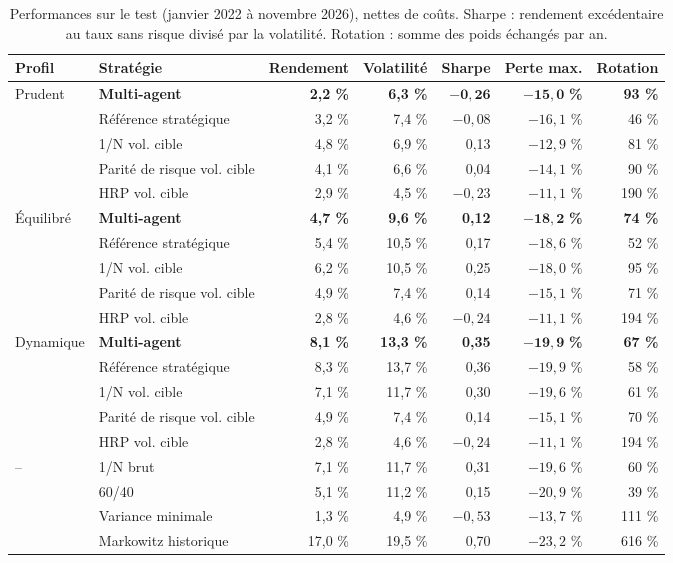 \begin{table}[!htb]
  \centering
  \small
  \caption{Performances sur le test (janvier 2022 à novembre 2026), nettes de coûts. Sharpe : rendement excédentaire au taux sans risque divisé par la volatilité. Rotation : somme des poids échangés par an.}
  \label{tab:backtest}
  \setlength{\tabcolsep}{5pt}
  \begin{tabular}{@{}l l r r r r r@{}}
    \toprule
    \textbf{Profil} & \textbf{Stratégie} & \textbf{Rendement} & \textbf{Volatilité} & \textbf{Sharpe} & \textbf{Perte max.} & \textbf{Rotation} \\
    \midrule
    \multirow{5}{*}{Prudent} & \textbf{Multi-agent} & \textbf{2,2 \%} & \textbf{6,3 \%} & $\boldsymbol{-0{,}26}$ & $\boldsymbol{-15{,}0}$ \textbf{\%} & \textbf{93 \%} \\
     & Référence stratégique & 3,2 \% & 7,4 \% & $-0{,}08$ & $-16{,}1$ \% & 46 \% \\
     & 1/N vol. cible & 4,8 \% & 6,9 \% & 0,13 & $-12{,}9$ \% & 81 \% \\
     & Parité de risque vol. cible & 4,1 \% & 6,6 \% & 0,04 & $-14{,}1$ \% & 90 \% \\
     & HRP vol. cible & 2,9 \% & 4,5 \% & $-0{,}23$ & $-11{,}1$ \% & 190 \% \\
    \midrule
    \multirow{5}{*}{Équilibré} & \textbf{Multi-agent} & \textbf{4,7 \%} & \textbf{9,6 \%} & \textbf{0,12} & $\boldsymbol{-18{,}2}$ \textbf{\%} & \textbf{74 \%} \\
     & Référence stratégique & 5,4 \% & 10,5 \% & 0,17 & $-18{,}6$ \% & 52 \% \\
     & 1/N vol. cible & 6,2 \% & 10,5 \% & 0,25 & $-18{,}0$ \% & 95 \% \\
     & Parité de risque vol. cible & 4,9 \% & 7,4 \% & 0,14 & $-15{,}1$ \% & 71 \% \\
     & HRP vol. cible & 2,8 \% & 4,6 \% & $-0{,}24$ & $-11{,}1$ \% & 194 \% \\
    \midrule
    \multirow{5}{*}{Dynamique} & \textbf{Multi-agent} & \textbf{8,1 \%} & \textbf{13,3 \%} & \textbf{0,35} & $\boldsymbol{-19{,}9}$ \textbf{\%} & \textbf{67 \%} \\
     & Référence stratégique & 8,3 \% & 13,7 \% & 0,36 & $-19{,}9$ \% & 58 \% \\
     & 1/N vol. cible & 7,1 \% & 11,7 \% & 0,30 & $-19{,}6$ \% & 61 \% \\
     & Parité de risque vol. cible & 4,9 \% & 7,4 \% & 0,14 & $-15{,}1$ \% & 70 \% \\
     & HRP vol. cible & 2,8 \% & 4,6 \% & $-0{,}24$ & $-11{,}1$ \% & 194 \% \\
    \midrule
    \multirow{4}{*}{--} & 1/N brut & 7,1 \% & 11,7 \% & 0,31 & $-19{,}6$ \% & 60 \% \\
     & 60/40 & 5,1 \% & 11,2 \% & 0,15 & $-20{,}9$ \% & 39 \% \\
     & Variance minimale & 1,3 \% & 4,9 \% & $-0{,}53$ & $-13{,}7$ \% & 111 \% \\
     & Markowitz historique & 17,0 \% & 19,5 \% & 0,70 & $-23{,}2$ \% & 616 \% \\
    \bottomrule
  \end{tabular}
\end{table}

